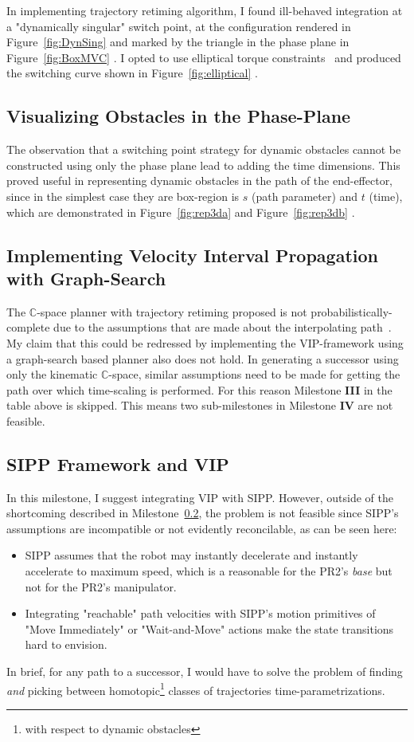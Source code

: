 \documentclass[letterpaper,11pt]{article} %
\newcommand{\reffig}[1]
{
Figure~\ref{fig:#1}
}
\begin{document}
In implementing trajectory retiming algorithm, I found ill-behaved integration at a "dynamically singular" switch point, at the configuration rendered in\reffig{DynSing} and marked by the triangle in the phase plane in \reffig{BoxMVC}. I opted to use elliptical torque constraints~\cite{shiller1992computation} and produced the switching curve shown in\reffig{elliptical}.

\subsection{Visualizing Obstacles in the Phase-Plane}

The observation that a switching point strategy for dynamic obstacles cannot be constructed using only the phase plane lead to adding the time dimensions. This proved useful in representing dynamic obstacles in the path of the end-effector, since in the simplest case they are box-region is $s$ (path parameter) and $t$ (time), which are demonstrated in\reffig{rep3da} and\reffig{rep3db}.

\subsection{Implementing Velocity Interval Propagation with Graph-Search}\label{subsec:vip}

The $\mathbb{C}$-space planner with trajectory retiming proposed is not probabilistically-complete due to the assumptions that are made about the interpolating path~\cite{pham2013velocity}. My claim that this could be redressed by implementing the VIP-framework using a graph-search based planner also does not hold. In generating a successor using only the kinematic $\mathbb{C}$-space, similar assumptions need to be made for getting the path over which time-scaling is performed. For this reason Milestone \textbf{III} in the table above is skipped. This means two sub-milestones in Milestone \textbf{IV} are not feasible.

\subsection{SIPP Framework and VIP}\label{subsec:ammend}

In this milestone, I suggest integrating VIP with SIPP. However, outside of the shortcoming described in Milestone~\ref{subsec:vip}, the problem is not feasible since SIPP's assumptions are incompatible or not evidently reconcilable, as can be seen here:
\begin{itemize}
\item SIPP assumes that the robot may instantly decelerate and instantly accelerate to maximum speed, which is a reasonable for the PR2's \emph{base} but not for the PR2's manipulator. 
\item Integrating "reachable" path velocities with SIPP's motion primitives of "Move Immediately" or "Wait-and-Move" actions make the state transitions hard to envision.
\end{itemize} 
In brief, for any path to a successor, I would have to solve the problem of finding \emph{and} picking between homotopic\footnote{with respect to dynamic obstacles} classes of trajectories time-parametrizations.
\end{document}
